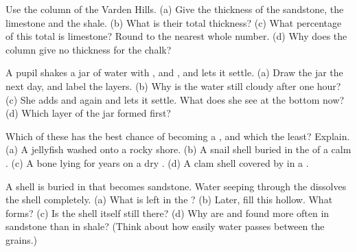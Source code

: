 \begin{exercise}[$\star\star$]\label{exo:g7:sediments-and-fossils:5}
Use the column of the Varden Hills. (a) Give the thickness of the
sandstone, the limestone and the shale. (b) What is their total
thickness? (c) What percentage of this total is limestone? Round to the
nearest whole number. (d) Why does the column give no thickness for the
chalk?
\end{exercise}

\begin{exercise}[$\star\star$]\label{exo:g7:sediments-and-fossils:6}
A pupil shakes a jar of water with ,  and , and lets it
settle. (a) Draw the jar the next day, and label the layers. (b) Why is
the water still cloudy after one hour? (c) She adds  and  again
and lets it settle. What does she see at the bottom now? (d) Which layer
of the jar formed first?
\end{exercise}

\begin{exercise}[$\star\star$]\label{exo:g7:sediments-and-fossils:7}
Which of these has the best chance of becoming a , and which the
least? Explain. (a) A jellyfish washed onto a rocky shore. (b) A snail
shell buried in the  of a calm . (c) A bone lying for years on a
dry . (d) A clam shell covered by  in a  .
\end{exercise}

\begin{exercise}[$\star\star$]\label{exo:g7:sediments-and-fossils:8}
A shell is buried in  that becomes sandstone. Water seeping through
the  dissolves the shell completely. (a) What is left in the ?
(b) Later,  fill this hollow. What forms? (c) Is the shell itself
still there? (d) Why are  and  found more often in sandstone
than in shale? (Think about how easily water passes between the grains.)
\end{exercise}

